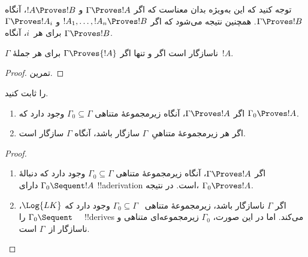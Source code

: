\documentclass[../../../include/open-logic-section]{subfiles}
\begin{document}
توجه کنید که این به‌ویژه بدان معناست که اگر $\Gamma \Proves !A$ و
$!A \Proves !B$، آنگاه $\Gamma \Proves !B$. همچنین نتیجه می‌شود که
اگر $!A_1, \dots, !A_n \Proves !B$ و $\Gamma \Proves !A_i$ برای
هر~$i$، آنگاه $\Gamma \Proves !B$.

\begin{prop}
$\Gamma$ ناسازگار است اگر و تنها اگر $\Gamma \Proves {!A}$ برای هر
جملهٔ~$!A$.
\end{prop}

\begin{proof}
تمرین.
\end{proof}

\begin{prob}
 را ثابت کنید.
\end{prob}

\begin{prop}[فشردگی]
  \begin{enumerate}
  \item اگر $\Gamma \Proves !A$، آنگاه زیرمجموعهٔ متناهی
    $\Gamma_0 \subseteq \Gamma$ وجود دارد که $\Gamma_0 \Proves !A$.
  \item اگر هر زیرمجموعهٔ متناهیِ~$\Gamma$ سازگار باشد، آنگاه
    $\Gamma$ سازگار است.
  \end{enumerate}
\end{prop}

\begin{proof}
  \begin{enumerate}
    \item اگر $\Gamma \Proves !A$، آنگاه زیرمجموعهٔ متناهی
      $\Gamma_0 \subseteq \Gamma$ وجود دارد که دنبالهٔ
      $\Gamma_0 \Sequent !A$ دارای !!a{derivation} است. در نتیجه،
      $\Gamma_0 \Proves !A$.
    \item اگر $\Gamma$ ناسازگار باشد، زیرمجموعهٔ متناهی
      ~$\Gamma_0 \subseteq \Gamma$ وجود دارد که $\Log{LK}$،
      $\Gamma_0 \Sequent \quad$ را !!{derive}s می‌کند. اما در این صورت،
      $\Gamma_0$ زیرمجموعه‌ای متناهی و ناسازگار از~$\Gamma$ است.
  \end{enumerate}
\end{proof}
\end{document}
